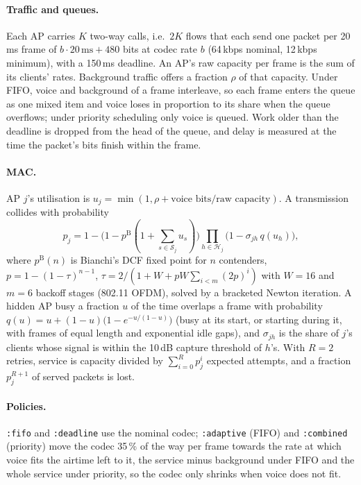 \documentclass[10pt]{article}
\newcommand{\code}[1]{\texttt{#1}}
\begin{document}
\paragraph{Traffic and queues.}
Each AP carries $K$ two-way calls, i.e.\ $2K$ flows that each send one packet per 20\,ms frame of
$b\cdot 20\,\text{ms} + 480$ bits at codec rate $b$ (64\,kbps nominal, 12\,kbps minimum), with a 150\,ms deadline.
An AP's raw capacity per frame is the sum of its clients' rates. Background traffic offers a fraction $\rho$ of that
capacity. Under FIFO, voice and background of a frame interleave, so each frame enters the queue as one mixed item and voice
loses in proportion to its share when the queue overflows; under priority scheduling only voice is queued. Work older than
the deadline is dropped from the head of the queue, and delay is measured at the time the packet's bits finish within the
frame.

\paragraph{MAC.}
AP $j$'s utilisation is $u_j = \min(1, \rho + \text{voice bits}/\text{raw capacity})$. A transmission collides with
probability
\[
  p_j = 1 - \big(1 - p^{\mathrm B}(1 + \textstyle\sum_{s \in \mathcal S_j} u_s)\big)
            \prod_{h \in \mathcal H_j} \big(1 - \sigma_{jh}\, q(u_h)\big),
\]
where $p^{\mathrm B}(n)$ is Bianchi's DCF fixed point \cite{bianchi} for $n$ contenders,
$p = 1 - (1-\tau)^{n-1}$, $\tau = 2/(1 + W + pW\sum_{i<m}(2p)^i)$ with $W = 16$ and $m = 6$ backoff stages (802.11 OFDM),
solved by a bracketed Newton iteration. A hidden AP busy a fraction $u$ of the time overlaps a frame with probability
$q(u) = u + (1-u)\big(1 - e^{-u/(1-u)}\big)$ (busy at its start, or starting during it, with frames of equal length and
exponential idle gaps), and $\sigma_{jh}$ is the share of $j$'s clients whose signal is within the 10\,dB capture
threshold of $h$'s. With $R = 2$ retries, service is capacity divided by $\sum_{i=0}^{R} p_j^i$ expected attempts, and a
fraction $p_j^{R+1}$ of served packets is lost.

\paragraph{Policies.}
\code{:fifo} and \code{:deadline} use the nominal codec; \code{:adaptive} (FIFO) and \code{:combined} (priority) move the codec
35\,\% of the way per frame towards the rate at which voice fits the airtime left to it, the service minus background under
FIFO and the whole service under priority, so the codec only shrinks when voice does not fit.
\end{document}
